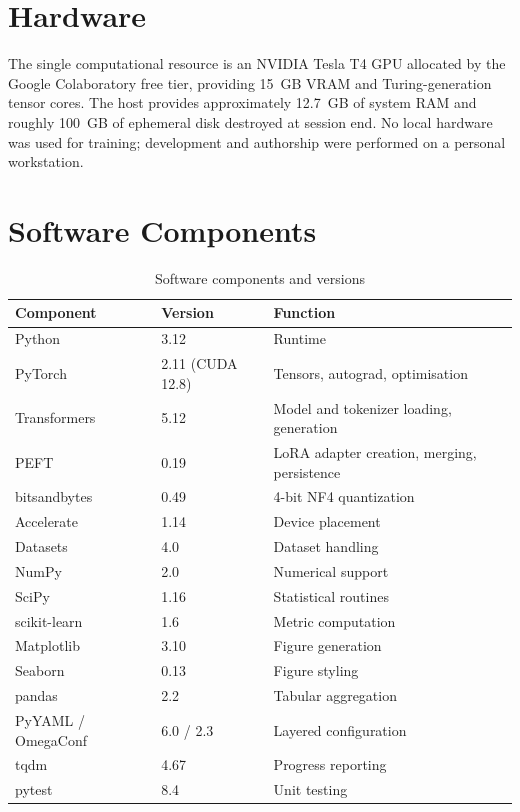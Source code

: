 \documentclass[12pt,a4paper]{report}
\begin{document}
\section{Hardware}

The single computational resource is an NVIDIA Tesla T4 GPU allocated by the Google Colaboratory free tier, providing 15~GB VRAM and Turing-generation tensor cores. The host provides approximately 12.7~GB of system RAM and roughly 100~GB of ephemeral disk destroyed at session end. No local hardware was used for training; development and authorship were performed on a personal workstation.

\section{Software Components}

\begin{table}[htbp]
\centering
\caption{Software components and versions}
\begin{tabular}{>{\raggedright\arraybackslash}p{3.5cm} p{2.5cm} p{5.5cm}}
\toprule
\textbf{Component} & \textbf{Version} & \textbf{Function} \\
\midrule
Python & 3.12 & Runtime \\
PyTorch & 2.11 (CUDA 12.8) & Tensors, autograd, optimisation \\
Transformers & 5.12 & Model and tokenizer loading, generation \\
PEFT & 0.19 & LoRA adapter creation, merging, persistence \\
bitsandbytes & 0.49 & 4-bit NF4 quantization \\
Accelerate & 1.14 & Device placement \\
Datasets & 4.0 & Dataset handling \\
NumPy & 2.0 & Numerical support \\
SciPy & 1.16 & Statistical routines \\
scikit-learn & 1.6 & Metric computation \\
Matplotlib & 3.10 & Figure generation \\
Seaborn & 0.13 & Figure styling \\
pandas & 2.2 & Tabular aggregation \\
PyYAML / OmegaConf & 6.0 / 2.3 & Layered configuration \\
tqdm & 4.67 & Progress reporting \\
pytest & 8.4 & Unit testing \\
\bottomrule
\end{tabular}
\end{table}
\end{document}
